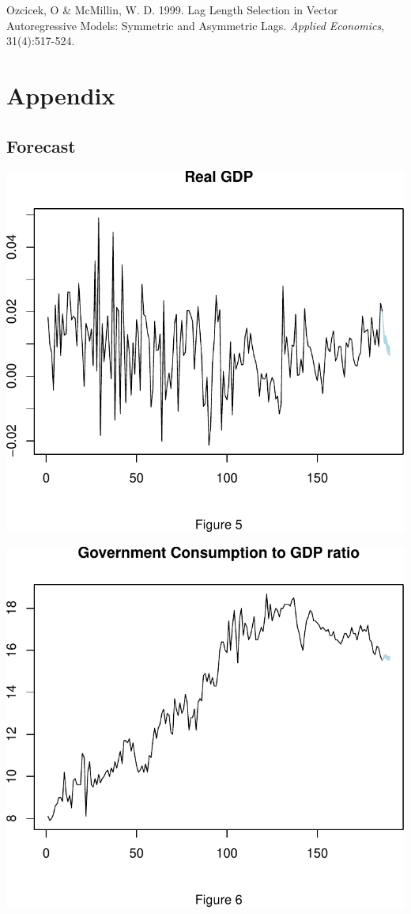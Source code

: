 \documentclass[11pt,preprint, authoryear]{elsarticle}
\numberwithin{equation}{section}
\numberwithin{figure}{section}
\numberwithin{table}{section}
\begin{document}
Ozcicek, O \& McMillin, W. D. 1999. Lag Length Selection in Vector
Autoregressive Models: Symmetric and Asymmetric Lags. \emph{Applied
Economics}, 31(4):517-524.

\newpage

\hypertarget{appendix}{%
\section{Appendix}\label{appendix}}

\hypertarget{forecast}{%
\subsection{Forecast}\label{forecast}}

\includegraphics{TS_proj_files/figure-latex/unnamed-chunk-28-1.pdf}

\includegraphics{TS_proj_files/figure-latex/unnamed-chunk-29-1.pdf}
\end{document}
